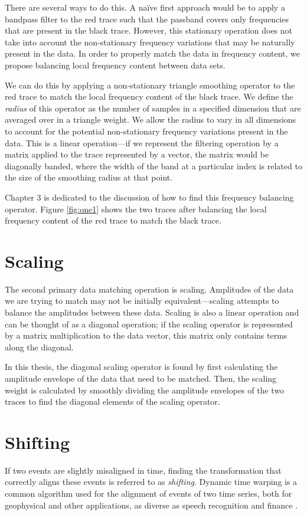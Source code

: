 There are several ways to do this.
A na\"ive first approach would be to apply a bandpass filter to the red trace such that the passband covers only frequencies that are present in the black trace.
However, this stationary operation does not take into account the non-stationary frequency variations that may be naturally present in the data.
In order to properly match the data in frequency content, we propose balancing local frequency content between data sets.

We can do this by applying a non-stationary triangle smoothing operator to the red trace to match the local frequency content of the black trace.
We define the {\em radius} of this operator as the number of samples in a specified dimension that are averaged over in a triangle weight.
We allow the radius to vary in all dimensions to account for the potential non-stationary frequency variations present in the data.
This is a linear operation---if we represent the filtering operation by a matrix applied to the trace represented by a vector, the matrix would be diagonally banded, where the width of the band at a particular index is related to the size of the smoothing radius at that point.

Chapter 3 is dedicated to the discussion of how to find this frequency balancing operator.
Figure \ref{fig:one1} shows the two traces after balancing the local frequency content of the red trace to match the black trace.


\section{Scaling}
The second primary data matching operation is scaling. 
Amplitudes of the data we are trying to match may not be initially equivalent---scaling attempts to balance the amplitudes between these data.
Scaling is also a linear operation and can be thought of as a diagonal operation; if the scaling operator is represented by a matrix multiplication to the data vector, this matrix only contains terms along the diagonal.

In this thesis, the diagonal scaling operator is found by first calculating the amplitude envelope of the data that need to be matched.
Then, the scaling weight is calculated by smoothly dividing the amplitude envelopes of the two traces to find the diagonal elements of the scaling operator.

\section{Shifting}
If two events are slightly misaligned in time, finding the transformation that correctly aligns these events is referred to as {\em shifting}.
Dynamic time warping is a common algorithm used for the alignment of events of two time series, both for geophysical and other applications, as diverse as speech recognition and finance \cite[]{herrera2012,hale2013,dtw,finance}.

